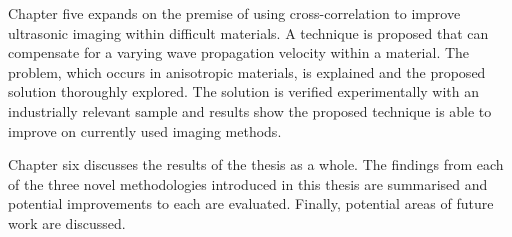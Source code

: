 Chapter five expands on the premise of using cross-correlation to improve ultrasonic imaging within difficult materials. A technique is proposed that can compensate for a varying wave propagation velocity within a material. The problem, which occurs in anisotropic materials, is explained and the proposed solution thoroughly explored. The solution is verified experimentally with an industrially relevant sample and results show the proposed technique is able to improve on currently used imaging methods.

Chapter six discusses the results of the thesis as a whole. The findings from each of the three novel methodologies introduced in this thesis are summarised and potential improvements to each are evaluated. Finally, potential areas of future work are discussed.



